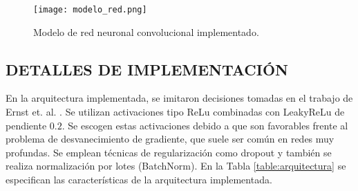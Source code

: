 \begin{figure}[H]
	\centering{}
	\texttt{[image: modelo\_red.png]}
	\caption{Modelo de red neuronal convolucional implementado.}
	\label{fig:modelo}
\end{figure}

\subsection[Detalles de implementación]{DETALLES DE IMPLEMENTACIÓN}

En la arquitectura implementada, se imitaron decisiones tomadas en el trabajo de Ernst et. al. \cite{FCN}. Se utilizan activaciones tipo ReLu combinadas con LeakyReLu  de pendiente $0.2$. Se escogen estas activaciones debido a que son favorables frente al problema de desvanecimiento de gradiente, que suele ser común en redes muy profundas. Se emplean técnicas de regularización como dropout y también se realiza normalización por lotes (BatchNorm). En la Tabla \ref{table:arquitectura} se especifican las características de la arquitectura implementada. 


